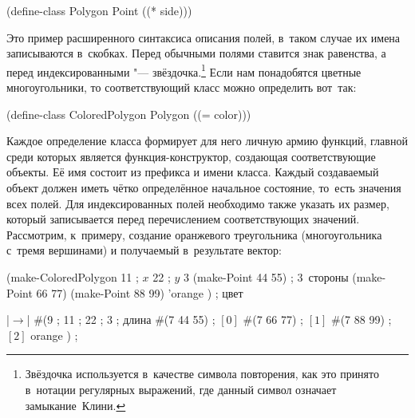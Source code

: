 \begin{code:lisp}
(define-class Polygon Point ((* side)))
\end{code:lisp}

Это пример расширенного синтаксиса описания полей, в~таком случае их имена
записываются в~скобках. Перед обычными полями ставится знак равенства, а перед
индексированными "--- звёздочка.\footnote*{Звёздочка используется в~качестве
символа повторения, как это принято в~нотации регулярных выражений, где данный
символ означает замыкание~Клини.} Если нам понадобятся цветные многоугольники,
то соответствующий класс можно определить вот~так:

\begin{code:lisp}
(define-class ColoredPolygon Polygon ((= color)))
\end{code:lisp}

Каждое определение класса формирует для него личную армию функций, главной среди
которых является функция-конструктор, создающая соответствующие объекты. Её имя
состоит из префикса  и имени класса. Каждый создаваемый объект должен
иметь чётко определённое начальное состояние, то~есть значения всех полей. Для
индексированных полей необходимо также указать их размер, который записывается
перед перечислением соответствующих значений. Рассмотрим, к~примеру, создание
оранжевого треугольника (многоугольника с~тремя вершинами) и получаемый
в~результате вектор:

\begin{code:lisp}
(make-ColoredPolygon
  11                      ; $x$
  22                      ; $y$
  3 (make-Point 44 55)    ; 3~стороны
    (make-Point 66 77)
    (make-Point 88 99)
  'orange )               ; цвет

|$\to$| #(9             ; 
       11          ; 
       22          ; 
       3           ; длина 
       #(7 44 55)  ; $[0]$
       #(7 66 77)  ; $[1]$
       #(7 88 99)  ; $[2]$
       orange )    ; 
\end{code:lisp}

